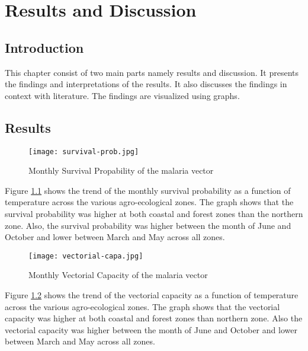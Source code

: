 \label{chapter4}

\chapter{Results and Discussion}
\section{Introduction}
This chapter consist of two main parts namely results and discussion. It presents the findings and interpretations of the results. It also discusses the findings in context with literature. The findings are visualized using graphs.

\section{Results}	

\begin{figure}[!ht]
	\centering
	\texttt{[image: survival-prob.jpg]}
	\caption{Monthly Survival Propability of the malaria vector}
	\label{fig4.1}
\end{figure}
\noindent Figure \ref{fig4.1} shows the trend of the monthly survival probability as a function of temperature across the various agro-ecological zones. The graph shows that the survival probability was higher at both coastal and forest zones than the northern zone. Also, the survival probability was higher  between the month of June and October and lower between March and May across all zones.

 
\begin{figure}[!ht]
	\centering
	\texttt{[image: vectorial-capa.jpg]}
	\caption{Monthly Vectorial Capacity of the malaria vector}
	\label{fig4.2}
\end{figure}

\noindent Figure \ref{fig4.2} shows the trend of the vectorial capacity as a function of temperature across the various agro-ecological zones. The graph shows that the vectorial capacity was higher at both coastal and forest zones than northern zone. Also the vectorial capacity was higher between the month of June and October and lower between March and May across all zones.


